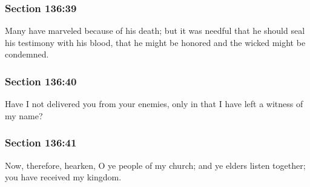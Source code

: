 	\subsubsection{Section 136:39} %
		\label{DC136-39}

		Many have marveled because of his death; but it was needful that he should seal his testimony with his blood, that he might be honored and the wicked might be condemned.


	\subsubsection{Section 136:40} %
		\label{DC136-40}

		Have I not delivered you from your enemies, only in that I have left a witness of my name?


	\subsubsection{Section 136:41} %
		\label{DC136-41}

		Now, therefore, hearken, O ye people of my church; and ye elders listen together; you have received my kingdom.


